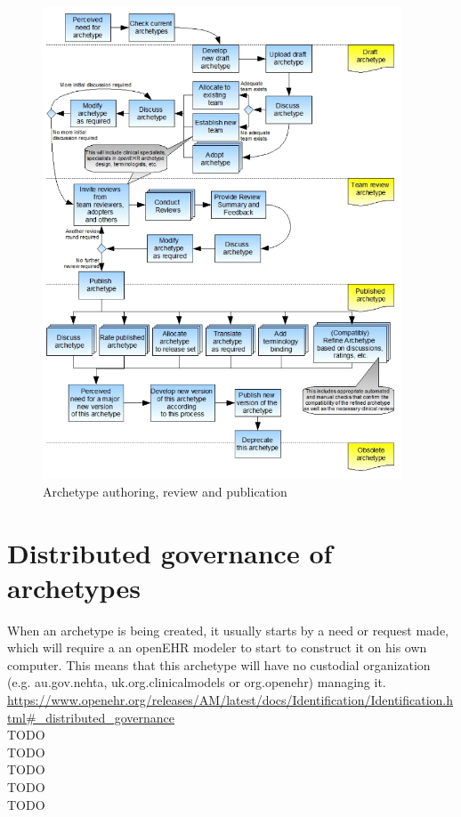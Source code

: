 \documentclass[mim_thesis.tex]{subfiles}
\begin{document}
\begin{figure}[H]
	\centering
    \includegraphics[width=0.95\textwidth]{img/arch_auth.PNG}
	\caption{Archetype authoring, review and publication \citep{Leslie2008}}
	\label{fig:arch_auth}
\end{figure}




\section{Distributed governance of archetypes}

When an archetype is being created, it usually starts by a need or request made, which will require a an openEHR modeler to start to construct it on his own computer. This means that this archetype will have no custodial organization (e.g. au.gov.nehta, uk.org.clinicalmodels or org.openehr) managing it. 
\url{https://www.openehr.org/releases/AM/latest/docs/Identification/Identification.html#_distributed_governance} \\

TODO\\
TODO\\
TODO\\
TODO\\
TODO\\
\end{document}
